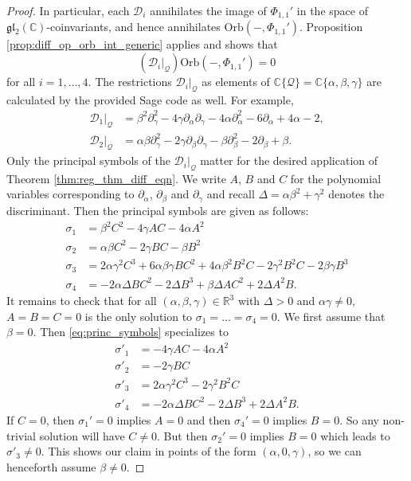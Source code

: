 \documentclass[reqno, 11pt]{amsart} %
\numberwithin{equation}{section}
\theoremstyle{plain}
\theoremstyle{definition}
\theoremstyle{remark}
\newcommand{\mbC}{\mathbb{C}}
\newcommand{\mbR}{\mathbb{R}}
\newcommand{\mcD}{\mathcal{D}}
\newcommand{\mcQ}{\mathcal{Q}}
\newcommand{\mfg}{\mathfrak{g}}
\newcommand{\mfl}{\mathfrak{l}}
\newcommand{\mfgl}{\mfg\mfl}
\newcommand{\calQ}{\mathcal Q}
\newcommand{\Orb}{\mathrm{Orb}}
\begin{document}
\begin{proof}
In particular, each $\mcD_i$ annihilates the image of $Φ_{1,1}'$ in the space of $\mfgl_2(\mbC)$-coinvariants, and hence annihilates $\Orb(-,Φ_{1,1}')$. Proposition \ref{prop:diff_op_orb_int_generic} applies and shows that
$$(\mcD_i\vert_\mcQ)\Orb(-,Φ_{1,1}') = 0$$
for all $i = 1,\ldots,4$. The restrictions $\mcD_i\vert_\mcQ$ as elements of $\mathbb C\{ \calQ\} = \mbC\{α, β, γ\}$ are calculated by the provided Sage code as well. For example,
\begin{equation}
\label{eq:restriction_abc_D_12}
\begin{aligned}
\mcD_1\vert_\mcQ & = β^2 \partial_γ^2 - 4 γ \partial_α\partial_γ - 4 α \partial_α^2 - 6\partial_α + 4α - 2,\\[1mm]
\mcD_2\vert_\mcQ & = αβ\partial_γ^2 - 2γ\partial_β\partial_γ - β\partial_β^2 - 2\partial_β + β.
\end{aligned}
\end{equation}
Only the principal symbols of the $\mcD_i\vert_\mcQ$ matter for the desired application of Theorem \ref{thm:reg_thm_diff_eqn}. We write $A$, $B$ and $C$ for the polynomial variables corresponding to $\partial_α$, $\partial_β$ and $\partial_γ$ and recall $Δ = αβ^2 + γ^2$ denotes the discriminant. Then the principal symbols are given as follows:
\begin{equation}
\label{eq:princ_symbols}
\begin{aligned}
σ_1 & = β^2C^2 - 4γAC - 4αA^2\\[1mm]
σ_2 & = αβC^2 - 2γBC - βB^2\\[1mm]
σ_3 & = 2αγ^2C^3 + 6αβγBC^2 + 4αβ^2B^2C - 2γ^2B^2C - 2βγB^3\\[1mm]
σ_4 & = -2αΔBC^2 - 2ΔB^3 + βΔAC^2 + 2ΔA^2B.
\end{aligned}
\end{equation}
It remains to check that for all $(α,β,γ)\in \mbR^3$ with $Δ >0$ and $αγ \neq 0$, $A = B = C = 0$ is the only solution to $σ_1 = \ldots = σ_4 = 0$.
We first assume that $β = 0$. Then \eqref{eq:princ_symbols} specializes to
\begin{equation}
\label{eq:princ_symbols_b_zero}
\begin{aligned}
σ'_1 & = - 4γAC - 4αA^2\\[1mm]
σ'_2 & = - 2γBC\\[1mm]
σ'_3 & = 2αγ^2C^3 - 2γ^2B^2C\\[1mm]
σ'_4 & = -2αΔBC^2 - 2ΔB^3 + 2ΔA^2B.
\end{aligned}
\end{equation}
If $C = 0$, then $σ_1' = 0$ implies $A = 0$ and then $σ_4' = 0$ implies $B = 0$. So any non-trivial solution will have $C \neq 0$. But then $σ_2' = 0$ implies $B = 0$ which leads to $σ'_3 \neq 0$. This shows our claim in points of the form $(α, 0, γ)$, so we can henceforth assume $β \neq 0$.


\end{proof}
\end{document}
